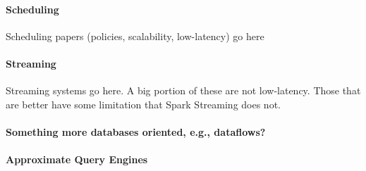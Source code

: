 
\paragraph {\bf Scheduling} Scheduling papers (policies, scalability, low-latency) go here~\cite{Sparrow}

\paragraph {\bf Streaming} Streaming systems go here. A big portion of these are not low-latency. Those that are better have some limitation that Spark Streaming does not.

\paragraph {\bf Something more databases oriented, e.g., dataflows?}

\paragraph {\bf Approximate Query Engines} \cite{BlinkDB}
